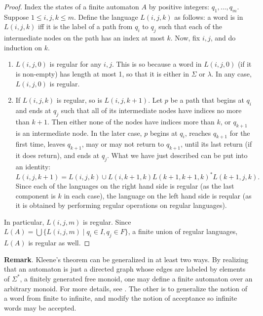 \documentclass[12pt]{article}
\begin{document}
\begin{proof}
Index the states of a finite automaton $A$ by positive integers: $q_1, \ldots, q_m$.  Suppose $1\le i,j,k\le m$.  Define the language $L(i,j,k)$ as follows: a word is in $L(i,j,k)$ iff it is the label of a path from $q_i$ to $q_j$ such that each of the intermediate nodes on the path has an index at most $k$.
Now, fix $i,j$, and do induction on $k$.
\begin{enumerate}
\item $L(i,j,0)$ is regular for any $i,j$.  This is so because a word in $L(i,j,0)$ (if it is non-empty) has length at most 1, so that it is either in $\Sigma$ or $\lambda$.  In any case, $L(i,j,0)$ is regular.
\item If $L(i,j,k)$ is regular, so is $L(i,j,k+1)$.  Let $p$ be a path that begins at $q_i$ and ends at $q_j$ such that all of its intermediate nodes have indices no more than $k+1$.  Then either none of the nodes have indices more than $k$, or $q_{k+1}$ is an intermediate node.  In the later case, $p$ begins at $q_i$, reaches $q_{k+1}$ for the first time, leaves $q_{k+1}$, may or may not return to $q_{k+1}$, until its last return (if it does return), and ends at $q_j$.  What we have just described can be put into an identity:
$$L(i,j,k+1)=L(i,j,k)\cup L(i,k+1,k)L(k+1,k+1,k)^*L(k+1,j,k).$$
Since each of the languages on the right hand side is regular (as the last component is $k$ in each case), the language on the left hand side is reqular (as it is obtained by performing regular operations on regular languages).
\end{enumerate}
In particular, $L(i,j,m)$ is regular.  Since $L(A) = \bigcup \lbrace L(i,j,m)\mid q_i\in I, q_j\in F\rbrace$, a finite union of regular languages, $L(A)$ is regular as well.
\end{proof}

\textbf{Remark}.  Kleene's theorem can be generalized in at least two ways.  By realizing that an automaton is just a directed graph whose edges are labeled by elements of $\Sigma^*$, a finitely generated free monoid, one may define a finite automaton over an arbitrary monoid.  For more details, see .  The other is to generalize the notion of a word from finite to infinite, and modify the notion of acceptance so infinite words may be accepted.
\end{document}
